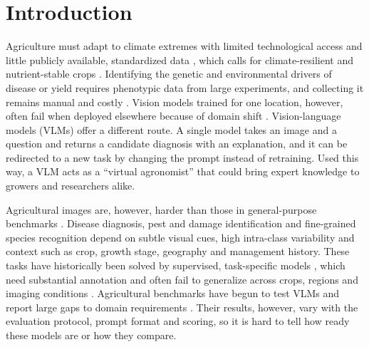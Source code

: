 \documentclass[10pt,letterpaper]{article}
\begin{document}
\begin{abstract}
\end{abstract}

\section{Introduction}
\label{sec:intro}

Agriculture must adapt to climate extremes with limited technological access and little publicly available, standardized data \cite{aijaz_artificial_2025}, which calls for climate-resilient and nutrient-stable crops \cite{berlingeri_integration_2025}. Identifying the genetic and environmental drivers of disease or yield requires phenotypic data from large experiments, and collecting it remains manual and costly \cite{reynolds_what_2019}. Vision models trained for one location, however, often fail when deployed elsewhere because of domain shift \cite{hu_domain_2025}. Vision-language models (VLMs) offer a different route. A single model takes an image and a question and returns a candidate diagnosis with an explanation, and it can be redirected to a new task by changing the prompt instead of retraining. Used this way, a VLM acts as a ``virtual agronomist'' that could bring expert knowledge to growers and researchers alike.

Agricultural images are, however, harder than those in general-purpose benchmarks \cite{huang_evaluating_2025}. Disease diagnosis, pest and damage identification and fine-grained species recognition depend on subtle visual cues, high intra-class variability and context such as crop, growth stage, geography and management history. These tasks have historically been solved by supervised, task-specific models \cite{kamilaris_deep_2018}, which need substantial annotation and often fail to generalize across crops, regions and imaging conditions \cite{magistri_one_2023, zhang_unsupervised_2022, yang_enhancing_2025}. Agricultural benchmarks have begun to test VLMs and report large gaps to domain requirements \cite{joshi_standardizing_2023, arshad_leveraging_2025, shinoda_agrobench_2025}. Their results, however, vary with the evaluation protocol, prompt format and scoring, so it is hard to tell how ready these models are or how they compare.
\end{document}
